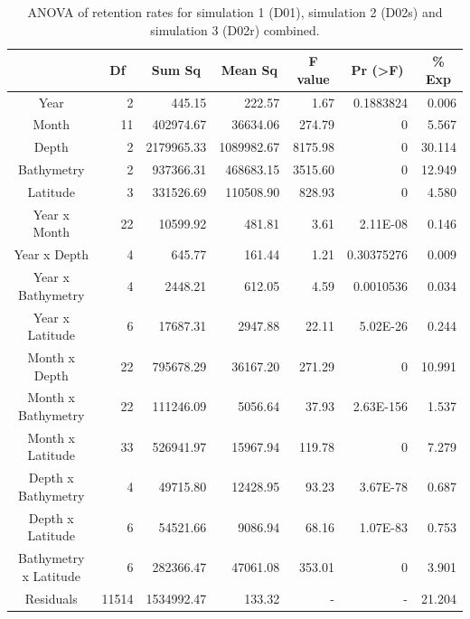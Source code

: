 \begin{landscape}
\begin{table}
\begin{tabular}{c|r|r|r|r|r|r}
\hline
 &
  \multicolumn{1}{c|}{\textbf{Df}} &
  \multicolumn{1}{c|}{\textbf{Sum Sq}} &
  \multicolumn{1}{c|}{\textbf{Mean Sq}} &
  \multicolumn{1}{c|}{\textbf{F value}} &
  \multicolumn{1}{c|}{\textbf{Pr (\textgreater{}F)}} &
  \multicolumn{1}{c}{\textbf{\% Exp}} \\
\hline
Year                  & 2     & 445.15     & 222.57     & 1.67    & 0.1883824  & 0.006  \\
Month                 & 11    & 402974.67  & 36634.06   & 274.79  & 0          & 5.567  \\
Depth                 & 2     & 2179965.33 & 1089982.67 & 8175.98 & 0          & 30.114 \\
Bathymetry            & 2     & 937366.31  & 468683.15  & 3515.60 & 0          & 12.949 \\
Latitude              & 3     & 331526.69  & 110508.90  & 828.93  & 0          & 4.580  \\
Year x Month          & 22    & 10599.92   & 481.81     & 3.61    & 2.11E-08   & 0.146  \\
Year x Depth          & 4     & 645.77     & 161.44     & 1.21    & 0.30375276 & 0.009  \\
Year x Bathymetry     & 4     & 2448.21    & 612.05     & 4.59    & 0.0010536  & 0.034  \\
Year x Latitude       & 6     & 17687.31   & 2947.88    & 22.11   & 5.02E-26   & 0.244  \\
Month x Depth         & 22    & 795678.29  & 36167.20   & 271.29  & 0          & 10.991 \\
Month x Bathymetry    & 22    & 111246.09  & 5056.64    & 37.93   & 2.63E-156  & 1.537  \\
Month x Latitude      & 33    & 526941.97  & 15967.94   & 119.78  & 0          & 7.279  \\
Depth x Bathymetry    & 4     & 49715.80   & 12428.95   & 93.23   & 3.67E-78   & 0.687  \\
Depth x Latitude      & 6     & 54521.66   & 9086.94    & 68.16   & 1.07E-83   & 0.753  \\
Bathymetry x Latitude & 6     & 282366.47  & 47061.08   & 353.01  & 0          & 3.901  \\
Residuals             & 11514 & 1534992.47 & 133.32     & -       & -          & 21.204
\end{tabular}
\caption{ANOVA of retention rates for simulation 1 (D01), simulation 2 (D02s) and simulation 3 (D02r) combined.}
\label{TabAnovaSimus}
\end{table}
\end{landscape}

